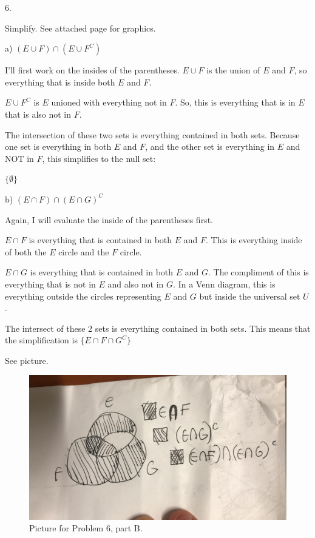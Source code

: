 \documentclass{article}
\begin{document}
6. 

Simplify. See attached page for graphics. 

a) $(E\cup F) \cap (E \cup F^{C})$

I'll first work on the insides of the parentheses. $E\cup F$ is the union of $E$ and $F$, so everything that is inside both $E$ and $F$.
 

$E\cup F^C$ is $E$ unioned with everything not in $F$. So, this is everything that is in $E$ that is also not in $F$. 


The intersection  of these two sets is everything contained in both sets.  Because one set is everything in both $E$ and $F$, and the other set is everything in $E$ and NOT in $F$, this simplifies to the null set: 

$\boxed{\{\emptyset\}}$

b) $(E\cap F) \cap (E \cap G)^{C}$

Again, I will evaluate the inside of the parentheses first. 

$E\cap F$ is everything that is contained in both $E$ and $F$. This is everything inside of both the $E$ circle and the $F$ circle. 
 
$E\cap G$ is everything that is contained in both $E$ and $G$. The compliment of this is everything that is not in $E$ and also not in $G$. In a Venn diagram, this is everything outside the circles representing $E$ and $G$ but inside the universal set $U$. 

The intersect of these 2 sets is everything contained in both sets. This means that the simplification is $\boxed{\{E \cap F \cap G^C\} }$



See picture. 
\begin{figure}
	\centering
	\includegraphics[width=400pt]{HW1P6b}
	\caption{Picture for Problem 6, part B. }
	\label{fig:hw1p6b}
\end{figure}
\end{document}
